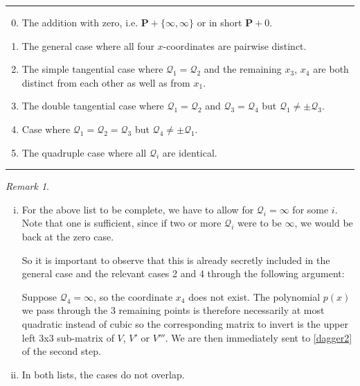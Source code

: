 \documentclass[english,11pt,a4paper]{article}
\theoremstyle{definition}
\theoremstyle{remark}
\newtheorem{remark}{Remark}
\theoremstyle{case}
\renewcommand{\P}{\mathbf{P}}
\newcommand{\q}{\mathcal{Q}}
\begin{document}
\vspace{-3mm}
\rule{\textwidth}{0.005in}
\begin{enumerate}\setcounter{enumi}{-1}
	\parskip 1mm
	\item The addition with zero, i.e. $\P + \{ \infty, \infty \}$ or in short $\P + 0$.
	\item The general case where all four $x$-coordinates are pairwise distinct.
	\item The simple tangential case where $\q_1 = \q_2$ and the remaining $x_3$, $x_4$ are both distinct from each other as well as from $x_1$.
	\item The double tangential case where $\q_1 = \q_2$ and $\q_3 = \q_4$ but $\q_1 \neq \pm \q_3$.
	\item Case where $\q_1=\q_2=\q_3$ but $\q_4 \neq \pm \q_1$.
	\item The quadruple case where all $\q_i$ are identical.
\end{enumerate}
\vspace{-3mm}
\rule{\textwidth}{0.005in}
\parskip 3mm

\begin{remark}\hfill
\begin{enumerate}[(i)]
	\item For the above list to be complete, we have to allow for $\q_i = \infty$ for some $i$. Note that one is sufficient, since if two or more $\q_i$ were to be $\infty$, we would be back at the zero case.

	So it is important to observe that this is already secretly included in the general case and the relevant cases 2 and 4 through the following argument:

	Suppose $\q_4 = \infty$, so the coordinate $x_4$ does not exist. The polynomial $p(x)$ we pass through the 3 remaining points is therefore necessarily at most quadratic instead of cubic so the corresponding matrix to invert is the upper left 3x3 sub-matrix of $V$, $V'$ or $V'''$. We are then immediately sent to \eqref{dagger2} of the second step.

	\item In both lists, the cases do not overlap.
\end{enumerate}
\end{remark}

\end{document}
